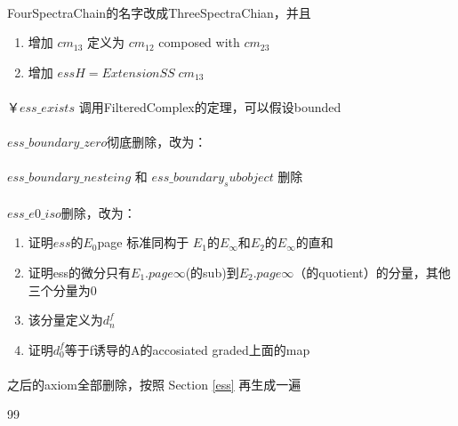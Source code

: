 \documentclass[12pt,a4paper]{article}
\begin{document}
\begin{sloppy}
\paragraph{}FourSpectraChain的名字改成ThreeSpectraChian，并且
\begin{enumerate}
    \item 增加 $cm_{13}$ 定义为 $cm_12$ composed with $cm_{23}$
    \item 增加 $essH = ExtensionSS\; cm_{13}$
\end{enumerate}

\paragraph{}
￥$ess\_exists$ 调用FilteredComplex的定理，可以假设bounded

\paragraph{}
$ess\_boundary\_zero$彻底删除，改为：
\paragraph{} $ess\_boundary\_nesteing$ 和 $ess\_boundary_subobject$ 删除

\paragraph{} $ess\_e0\_iso$删除，改为：
\begin{enumerate}
    \item 证明$ess$的$E_0$page 标准同构于 $E_1$的$E_\infty$和$E_2$的$E_\infty$的直和
    \item 证明ess的微分只有$E_1.page \infty$(的sub)到$E_2.page \infty$（的quotient）的分量，其他三个分量为0
    \item 该分量定义为$d_n^f$
    \item 证明$d_0^f$等于f诱导的A的accosiated graded上面的map

\end{enumerate}

\paragraph{}之后的axiom全部删除，按照 Section \ref{ess} 再生成一遍

\begin{thebibliography}{99}


\end{thebibliography}

\end{sloppy}
\end{document}
